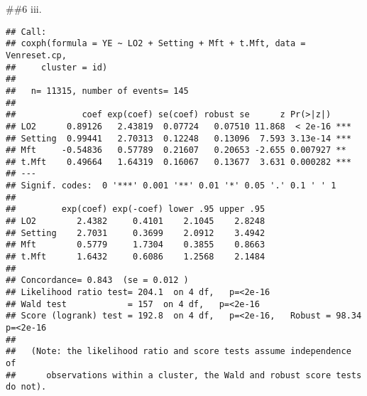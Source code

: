\documentclass[
]{article}
\newenvironment{Shaded}{\begin{snugshade}}{\end{snugshade}}
\newcommand{\AttributeTok}[1]{\textcolor[rgb]{0.77,0.63,0.00}{#1}}
\newcommand{\CommentTok}[1]{\textcolor[rgb]{0.56,0.35,0.01}{\textit{#1}}}
\newcommand{\DecValTok}[1]{\textcolor[rgb]{0.00,0.00,0.81}{#1}}
\newcommand{\FunctionTok}[1]{\textcolor[rgb]{0.00,0.00,0.00}{#1}}
\newcommand{\NormalTok}[1]{#1}
\newcommand{\OtherTok}[1]{\textcolor[rgb]{0.56,0.35,0.01}{#1}}
\newcommand{\SpecialCharTok}[1]{\textcolor[rgb]{0.00,0.00,0.00}{#1}}
\newcommand{\StringTok}[1]{\textcolor[rgb]{0.31,0.60,0.02}{#1}}
\begin{document}
\#\#6 iii.

\begin{Shaded}
\end{Shaded}

\begin{verbatim}
## Call:
## coxph(formula = YE ~ LO2 + Setting + Mft + t.Mft, data = Venreset.cp, 
##     cluster = id)
## 
##   n= 11315, number of events= 145 
## 
##             coef exp(coef) se(coef) robust se      z Pr(>|z|)    
## LO2      0.89126   2.43819  0.07724   0.07510 11.868  < 2e-16 ***
## Setting  0.99441   2.70313  0.12248   0.13096  7.593 3.13e-14 ***
## Mft     -0.54836   0.57789  0.21607   0.20653 -2.655 0.007927 ** 
## t.Mft    0.49664   1.64319  0.16067   0.13677  3.631 0.000282 ***
## ---
## Signif. codes:  0 '***' 0.001 '**' 0.01 '*' 0.05 '.' 0.1 ' ' 1
## 
##         exp(coef) exp(-coef) lower .95 upper .95
## LO2        2.4382     0.4101    2.1045    2.8248
## Setting    2.7031     0.3699    2.0912    3.4942
## Mft        0.5779     1.7304    0.3855    0.8663
## t.Mft      1.6432     0.6086    1.2568    2.1484
## 
## Concordance= 0.843  (se = 0.012 )
## Likelihood ratio test= 204.1  on 4 df,   p=<2e-16
## Wald test            = 157  on 4 df,   p=<2e-16
## Score (logrank) test = 192.8  on 4 df,   p=<2e-16,   Robust = 98.34  p=<2e-16
## 
##   (Note: the likelihood ratio and score tests assume independence of
##      observations within a cluster, the Wald and robust score tests do not).
\end{verbatim}
\end{document}

